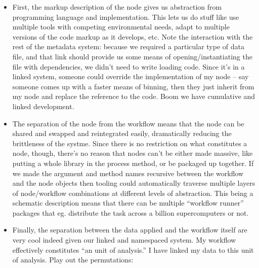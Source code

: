 \documentclass[10pt]{tufte-book}
\begin{document}
\begin{itemize}
\item
  First, the markup description of the node gives us abstraction from
  programming language and implementation. This lets us do stuff like
  use multiple tools with competing environmental needs, adapt to
  multiple versions of the code markup as it develops, etc. Note the
  interaction with the rest of the metadata system: because we required
  a particular type of data file, and that link should provide us some
  means of opening/instantiating the file with dependencies, we didn't
  need to write loading code. Since it's in a linked system, someone
  could override the implementation of my node -- say someone comes up
  with a faster means of binning, then they just inherit from my node
  and replace the reference to the code. Boom we have cumulative and
  linked development.
\item
  The separation of the node from the workflow means that the node can
  be shared and swapped and reintegrated easily, dramatically reducing
  the brittleness of the systme. Since there is no restriction on what
  constitutes a node, though, there's no reason that nodes can't be
  either made massive, like putting a whole library in the process
  method, or be packaged up together. If we made the argument and method
  names recursive between the workflow and the node objects then tooling
  could automatically traverse multiple layers of node/workflow
  combinations at different levels of abstraction. This being a
  schematic description means that there can be multiple ``workflow
  runner'' packages that eg. distribute the task across a billion
  supercomputers or not.
\item
  Finally, the separation between the data applied and the workflow
  itself are very cool indeed given our linked and namespaced system. My
  workflow effectively constitutes ``an unit of analysis.'' I have
  linked my data to this unit of analysis. Play out the permutations:

  \begin{itemize}
  

\end{itemize}
\end{itemize}
\end{document}
